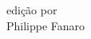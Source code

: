 \begin{titlepage}
  
  \vspace*{-0.15cm}


  \fontsize{21}{21}\selectfont edição por\\
  \fontsize{28}{28}\selectfont Philippe Fanaro

\end{titlepage}
